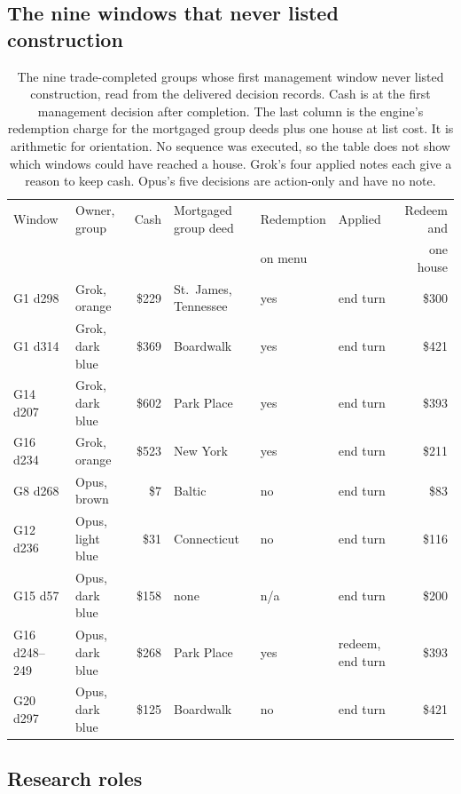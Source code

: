 \subsection{The nine windows that never listed construction}
\label{app:unbuilt}

\begin{table}[H]
\centering\footnotesize
\setlength{\tabcolsep}{4pt}
\begin{tabular}{@{}llrlllr@{}}
\toprule
Window & Owner, group & Cash & Mortgaged group deed & Redemption & Applied & Redeem and\\
 & & & & on menu & & one house\\
\midrule
G1 d298 & Grok, orange & \$229 & St.\ James, Tennessee & yes & end turn & \$300\\
G1 d314 & Grok, dark blue & \$369 & Boardwalk & yes & end turn & \$421\\
G14 d207 & Grok, dark blue & \$602 & Park Place & yes & end turn & \$393\\
G16 d234 & Grok, orange & \$523 & New York & yes & end turn & \$211\\
\addlinespace
G8 d268 & Opus, brown & \$7 & Baltic & no & end turn & \$83\\
G12 d236 & Opus, light blue & \$31 & Connecticut & no & end turn & \$116\\
G15 d57 & Opus, dark blue & \$158 & none & n/a & end turn & \$200\\
G16 d248--249 & Opus, dark blue & \$268 & Park Place & yes & redeem, end turn & \$393\\
G20 d297 & Opus, dark blue & \$125 & Boardwalk & no & end turn & \$421\\
\bottomrule
\end{tabular}
\caption{The nine trade-completed groups whose first management window never listed construction, read from the delivered decision records. Cash is at the first management decision after completion. The last column is the engine's redemption charge for the mortgaged group deeds plus one house at list cost. It is arithmetic for orientation. No sequence was executed, so the table does not show which windows could have reached a house. Grok's four applied notes each give a reason to keep cash. Opus's five decisions are action-only and have no note.}
\label{tab:unbuilt}
\end{table}

\subsection{Research roles}

